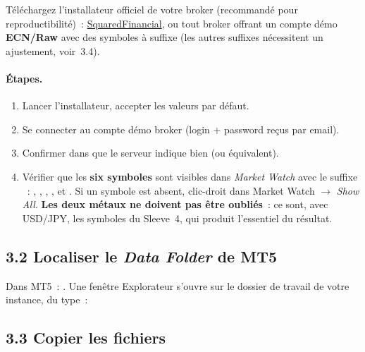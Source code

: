 \documentclass[11pt, a4paper]{scrartcl}
\begin{document}
Téléchargez l'installateur officiel de votre broker (recommandé pour
reproductibilité)~: \href{https://www.squared-financial.com}{SquaredFinancial},
ou tout broker offrant un compte démo \textbf{ECN/Raw} avec des symboles à
suffixe  (les autres suffixes nécessitent un ajustement, voir~3.4).

\paragraph{Étapes.}
\begin{enumerate}
\item Lancer l'installateur, accepter les valeurs par défaut.
\item Se connecter au compte démo broker (login + password reçus par email).
\item Confirmer dans  que le
serveur indique bien  (ou équivalent).
\item Vérifier que les \textbf{six symboles} sont visibles dans \emph{Market Watch}
avec le suffixe ~: , , ,
,  et . Si un symbole est absent,
clic-droit dans Market Watch $\rightarrow$ \emph{Show All}. \textbf{Les deux métaux
ne doivent pas être oubliés}~: ce sont, avec USD/JPY, les symboles du Sleeve~4, qui
produit l'essentiel du résultat.
\end{enumerate}

\subsection*{3.2 Localiser le \emph{Data Folder} de MT5}

Dans MT5~: . Une fenêtre Explorateur
s'ouvre sur le dossier de travail de votre instance, du type~:
\begin{center}
\end{center}

\subsection*{3.3 Copier les fichiers}
\end{document}
